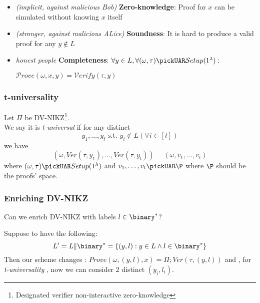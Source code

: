 \begin{itemize}
    \item \textit{(implicit, against malicious Bob)} \textbf{Zero-knowledge}: Proof for $x$ can be simulated without knowing $x$ itself
    \item \textit{(stronger, against malicious ALice)} \textbf{Soundness}: It is hard to produce a valid proof for any $y \notin L$
    \item \textit{honest people} \textbf{Completeness}: $\forall y \in L, \forall (\omega, \tau) \pickUAR \mathcal{S}etup(1^\lambda):$
    
    $\mathcal{P}rove(\omega, x, y) = \mathcal{V}erify(\tau, y)$
\end{itemize}


\subsubsection{t-universality}
\begin{definition}
    Let $\Pi$ be DV-NIKZ\footnote{Designated verifier non-interactive
    zero-knowledge}.\\
We say it is \textit{t-universal} if for any distinct 
\[
    y_{1}, \ldots, y_{t} \text{ s.t. } y_{i}\not\in L ( \forall i \in [t])
\]
we have 
\[
    ( \omega, Ver(\tau, y_{1}), \ldots, Ver(\tau, y_{t}))=(\omega, v_{1},
    \ldots, v_{t})
\]
where $(\omega, \tau) \pickUAR Setup(1^{\lambda})$ and $v_{1}, \ldots, v_{t}
\pickUAR \P$ where $\P$ should be the proofs' space.
\end{definition}

\subsubsection{Enriching DV-NIKZ}
Can we enrich DV-NIKZ with labels $l \in \binary^{*}$?

Suppose to have the following:
\[
    L'=L \| \binary^{*}=\{(y,l): y \in L \wedge l \in \binary^{*}\}
\]
Then our scheme changes :
$Prove(\omega, (y,l), x)=\Pi; Ver(\tau, (y, l)) $
and , for \textit{t-universality} , now we can consider 2 distinct $(y_{i},
l_{i})$.
